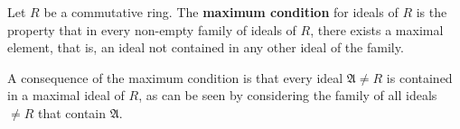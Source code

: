 Let $R$ be a commutative ring. The \textbf{maximum condition} for ideals of $R$ is the property that in every non-empty family of ideals of $R$, there exists a maximal element, that is, an ideal not contained in any other ideal of the family.

A consequence of the maximum condition is that every ideal $\mathfrak{A} \neq R$ is contained in a maximal ideal of $R$, as can be seen by considering the family of all ideals $\neq R$ that contain $\mathfrak{A}$.
